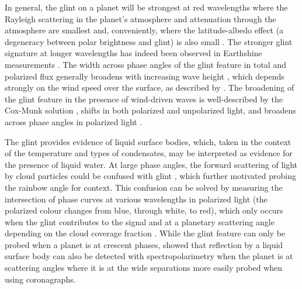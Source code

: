 \documentclass[
    usenatbib,
]{mnras}
\begin{document}
In general, the glint on a planet will be strongest at red wavelengths where the Rayleigh scattering in the planet's atmosphere and attenuation through the atmosphere are smallest \citep{Zugger_2011} and, conveniently, where the latitude-albedo effect (a degeneracy between polar brightness and glint) is also small \citep{2012ApJ...752L...3C}.
%
The stronger glint signature at longer wavelengths has indeed been observed in Earthshine measurements \citep{Emde2017,sterzik2019, takahashi2021}.
%
The width across phase angles of the glint feature in total and polarized flux generally
broadens with increasing wave height \citep{kopparla2018, Zugger_2010, treesandstam2019, trees2022}, which depends strongly on the wind speed over the surface, as described by \citep{CoxMunk1954}.
%
{\color{red}{check the next sentence:}}
The broadening of the glint feature in the presence of wind-driven waves is well-described by the Cox-Munk solution \citep{CoxMunk1954}, shifts in both polarized and unpolarized light, and broadens across phase angles in polarized light \citep{kopparla2018, Zugger_2010, treesandstam2019, trees2022}. 

The glint provides evidence of liquid surface bodies, which, taken in the context of the temperature and types of condensates, may be interpreted as evidence for the presence of liquid water.
%
At large phase angles, the forward scattering of light by cloud particles could be confused with glint \citep{Robinson_2010}, which further motivated probing the rainbow angle for context.
%
This confusion can be solved by measuring the intersection of phase curves at various wavelengths in polarized light (the polarized colour changes from blue, through white, to red), which only occurs when the glint contributes to the signal and at a planetary scattering angle depending on the cloud coverage fraction \citep{treesandstam2019}.
%
While the glint feature can only be probed when a planet is at crescent phases, \citet{trees2022} showed that reflection by a liquid surface body can also be detected with spectropolarimetry when the planet is at scattering angles where it is at the wide separations more easily probed when using coronagraphs.
\end{document}
